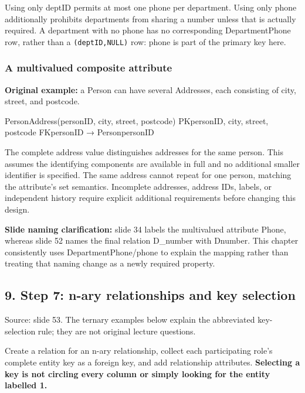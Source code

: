 Using only deptID permits at most one phone per department. Using only phone additionally prohibits departments from sharing a number unless that is actually required. A department with no phone has no corresponding DepartmentPhone row, rather than a \texttt{(\allowbreak{}deptID,\allowbreak{}NULL)\allowbreak{}} row: phone is part of the primary key here.

\subsubsection{A multivalued composite attribute}\label{04_er_to_relational_mapping_en-a-multivalued-composite-attribute}

\textbf{Original example:} a Person can have several Addresses, each consisting of city, street, and postcode.

\begin{StudyCode}
PersonAddress(personID, city, street, postcode)
PK{personID, city, street, postcode}
FK{personID} → Person{personID}
\end{StudyCode}

The complete address value distinguishes addresses for the same person. This assumes the identifying components are available in full and no additional smaller identifier is specified. The same address cannot repeat for one person, matching the attribute's set semantics. Incomplete addresses, address IDs, labels, or independent history require explicit additional requirements before changing this design.

\textbf{Slide naming clarification:} slide 34 labels the multivalued attribute Phone, whereas slide 52 names the final relation D\_number with Dnumber. This chapter consistently uses DepartmentPhone/phone to explain the mapping rather than treating that naming change as a newly required property.

\subsection{9. Step 7: n-ary relationships and key selection}\label{04_er_to_relational_mapping_en-step-7-n-ary-relationships-and-key-selection}

Source: slide 53. The ternary examples below explain the abbreviated key-selection rule; they are not original lecture questions.

Create a relation for an n-ary relationship, collect each participating role's complete entity key as a foreign key, and add relationship attributes. \textbf{Selecting a key is not circling every column or simply looking for the entity labelled 1.}

